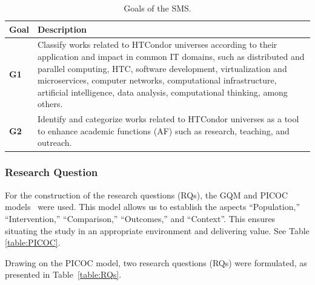 \begin{table}[htbp]
	\centering
	\caption{Goals of the SMS.}
	\label{table:Goals}
	\renewcommand{\arraystretch}{1}  %
	\begin{tabular}{p{1cm}p{6.8cm}}
		\toprule
		\textbf{Goal} & \textbf{Description}                                                                                                                                                                                                                                                                                                                                 \\
		\midrule
		\textbf{G1}   & Classify works related to HTCondor universes according to their application and impact in common IT domains, such as distributed and parallel computing, HTC, software development, virtualization and microservices, computer networks, computational infrastructure, artificial intelligence, data analysis, computational thinking, among others. \\
		\addlinespace[0.8em]
		\textbf{G2}   & Identify and categorize works related to HTCondor universes as a tool to enhance academic functions (AF) such as research, teaching, and outreach.                                                                                                                                                                                                   \\
		\bottomrule
	\end{tabular}
\end{table}


\subsubsection{Research Question}
For the construction of the research questions (RQs), the GQM and PICOC models~\cite{Needleman20026, Petticrew2008systematic} were used. This model allows us to establish the aspects ``Population,'' ``Intervention,'' ``Comparison,'' ``Outcomes,'' and ``Context''. This ensures situating the study in an appropriate environment and delivering value. See Table \ref{table:PICOC}.

Drawing on the PICOC model, two research questions (RQs) were formulated, as presented in Table~\ref{table:RQs}.

